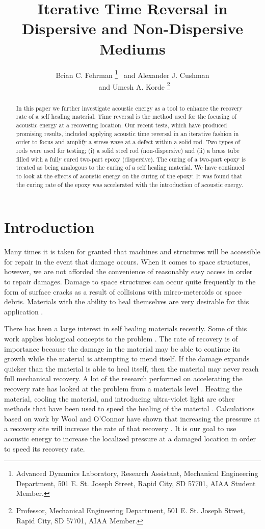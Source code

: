 \documentclass[]{aiaa-tc}%
\title{Iterative Time Reversal in Dispersive and Non-Dispersive Mediums}
\author{
  Brian C. Fehrman
    \thanks{Advanced Dynamics Laboratory, Research Assistant, Mechanical Engineering Department, 501 E. St. Joseph Street, Rapid
City, SD 57701, AIAA Student Member.}
  \ and Alexander J. Cushman \thanksibid{1}\\
  \ and Umesh A. Korde%
   \thanks{Professor, Mechanical Engineering Department, 501 E. St. Joseph Street, Rapid City, SD 57701, AIAA Member.}\\
 }
\begin{document}
\maketitle

\begin{abstract}
In this paper we further investigate acoustic energy as a tool to enhance the recovery rate of a self healing material. Time reversal is the method used for the focusing of acoustic energy at a recovering location. Our recent tests, which have produced promising results, included applying acoustic time reversal in an iterative fashion in order to focus and amplify a stress-wave at a defect within a solid rod. Two types of rods were used for testing; (i) a solid steel rod (non-dispersive) and (ii) a brass tube filled with a fully cured two-part epoxy (dispersive). The curing of a two-part epoxy is treated as being analogous to the curing of a self healing material. We have continued to look at the effects of acoustic energy on the curing of the epoxy. It was found that the curing rate of the epoxy was accelerated with the introduction of acoustic energy.
\end{abstract}


\section{Introduction}

Many times it is taken for granted that machines and structures will be accessible for repair in the event that damage occurs. When it comes to space structures, however, we are not afforded the convenience of reasonably easy access in order to repair damages. Damage to space structures can occur quite frequently in the form of surface cracks as a result of collisions with mirco-meteroids or space debris. Materials with the ability to heal themselves are very desirable for this application \cite{Lee2009}. 

There has been a large interest in self healing materials recently. Some of this work applies biological concepts to the problem \cite{Blaysik2010}. The rate of recovery is of importance because the damage in the material may be able to continue its growth while the material is attempting to mend itself. If the damage expands quicker than the material is able to heal itself, then the material may never reach full mechanical recovery.  A lot of the research performed on accelerating the recovery rate has looked at the problem from a materials level \cite{White2001, Sheng2009, Burattini2009, Nakao2009, Fettig2009, Imperiale2009, Zhang2007}. Heating the material, cooling the material, and introducing ultra-violet light are other methods that have been used to speed the healing of the material \cite{Sloof2009, Song2009, Bosman2009, Djugum2009, Murphy2009, Garcia2009}. Calculations based on work by Wool and O'Connor have shown that increasing the pressure at a recovery site will increase the rate of that recovery \cite{Wool1981, Barnes2009, Sarrazin2009}. It is our goal to use acoustic energy to increase the localized pressure at a damaged location in order to speed its recovery rate. 
\end{document}
